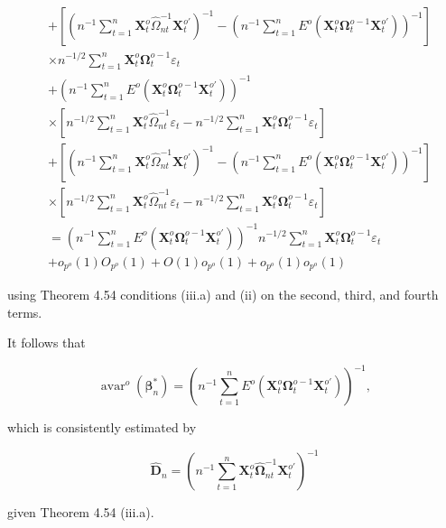 \documentclass[10pt]{article}
\begin{document}
$$
\begin{aligned}
& +\left[\left(n^{-1} \sum_{t=1}^{n} \mathbf{X}_{t}^{o} \hat{\Omega}_{n t}^{-1} \mathbf{X}_{t}^{o \prime}\right)^{-1}-\left(n^{-1} \sum_{t=1}^{n} E^{o}\left(\mathbf{X}_{t}^{o} \mathbf{\Omega}_{t}^{o-1} \mathbf{X}_{t}^{o \prime}\right)\right)^{-1}\right] \\
& \times n^{-1 / 2} \sum_{t=1}^{n} \mathbf{X}_{t}^{o} \mathbf{\Omega}_{t}^{o-1} \varepsilon_{t} \\
& +\left(n^{-1} \sum_{t=1}^{n} E^{o}\left(\mathbf{X}_{t}^{o} \mathbf{\Omega}_{t}^{o-1} \mathbf{X}_{t}^{o \prime}\right)\right)^{-1} \\
& \times\left[n^{-1 / 2} \sum_{t=1}^{n} \mathbf{X}_{t}^{o} \hat{\Omega}_{n t}^{-1} \varepsilon_{t}-n^{-1 / 2} \sum_{t=1}^{n} \mathbf{X}_{t}^{o} \mathbf{\Omega}_{t}^{o-1} \varepsilon_{t}\right] \\
& +\left[\left(n^{-1} \sum_{t=1}^{n} \mathbf{X}_{t}^{o} \hat{\Omega}_{n t}^{-1} \mathbf{X}_{t}^{o \prime}\right)^{-1}-\left(n^{-1} \sum_{t=1}^{n} E^{o}\left(\mathbf{X}_{t}^{o} \mathbf{\Omega}_{t}^{o-1} \mathbf{X}_{t}^{o \prime}\right)\right)^{-1}\right] \\
& \times\left[n^{-1 / 2} \sum_{t=1}^{n} \mathbf{X}_{t}^{o} \hat{\Omega}_{n t}^{-1} \varepsilon_{t}-n^{-1 / 2} \sum_{t=1}^{n} \mathbf{X}_{t}^{o} \mathbf{\Omega}_{t}^{o-1} \varepsilon_{t}\right] \\
& =\left(n^{-1} \sum_{t=1}^{n} E^{o}\left(\mathbf{X}_{t}^{o} \mathbf{\Omega}_{t}^{o-1} \mathbf{X}_{t}^{o \prime}\right)\right)^{-1} n^{-1 / 2} \sum_{t=1}^{n} \mathbf{X}_{t}^{o} \mathbf{\Omega}_{t}^{o-1} \varepsilon_{t} \\
& +o_{p^{o}}(1) O_{p^{o}}(1)+O(1) o_{p^{o}}(1)+o_{p^{o}}(1) o_{p^{o}}(1)
\end{aligned}
$$

using Theorem 4.54 conditions (iii.a) and (ii) on the second, third, and fourth terms.

It follows that

$$
\operatorname{avar}^{o}\left(\boldsymbol{\beta}_{n}^{*}\right)=\left(n^{-1} \sum_{t=1}^{n} E^{o}\left(\mathbf{X}_{t}^{o} \boldsymbol{\Omega}_{t}^{o-1} \mathbf{X}_{t}^{o \prime}\right)\right)^{-1},
$$

which is consistently estimated by

$$
\hat{\mathbf{D}}_{n}=\left(n^{-1} \sum_{t=1}^{n} \mathbf{X}_{t}^{o} \hat{\mathbf{\Omega}}_{n t}^{-1} \mathbf{X}_{t}^{o \prime}\right)^{-1}
$$

given Theorem 4.54 (iii.a).
\end{document}
